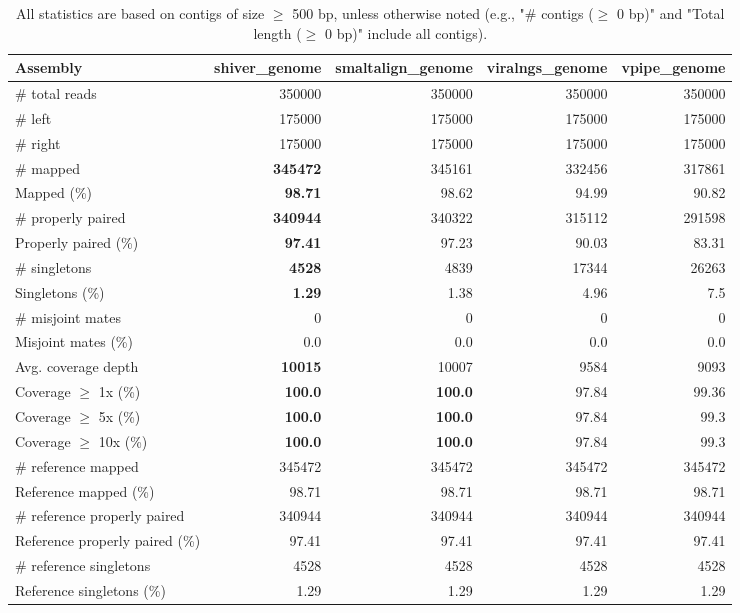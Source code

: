 \documentclass[12pt,a4paper]{article}
\begin{document}
\begin{table}[ht]
\begin{center}
\caption{All statistics are based on contigs of size $\geq$ 500 bp, unless otherwise noted (e.g., "\# contigs ($\geq$ 0 bp)" and "Total length ($\geq$ 0 bp)" include all contigs).}
\begin{tabular}{|l*{4}{|r}|}
\hline
Assembly & shiver\_genome & smaltalign\_genome & viralngs\_genome & vpipe\_genome \\ \hline
\# total reads & 350000 & 350000 & 350000 & 350000 \\ \hline
\# left & 175000 & 175000 & 175000 & 175000 \\ \hline
\# right & 175000 & 175000 & 175000 & 175000 \\ \hline
\# mapped & {\bf 345472} & 345161 & 332456 & 317861 \\ \hline
Mapped (\%) & {\bf 98.71} & 98.62 & 94.99 & 90.82 \\ \hline
\# properly paired & {\bf 340944} & 340322 & 315112 & 291598 \\ \hline
Properly paired (\%) & {\bf 97.41} & 97.23 & 90.03 & 83.31 \\ \hline
\# singletons & {\bf 4528} & 4839 & 17344 & 26263 \\ \hline
Singletons (\%) & {\bf 1.29} & 1.38 & 4.96 & 7.5 \\ \hline
\# misjoint mates & 0 & 0 & 0 & 0 \\ \hline
Misjoint mates (\%) & 0.0 & 0.0 & 0.0 & 0.0 \\ \hline
Avg. coverage depth & {\bf 10015} & 10007 & 9584 & 9093 \\ \hline
Coverage $\geq$ 1x (\%) & {\bf 100.0} & {\bf 100.0} & 97.84 & 99.36 \\ \hline
Coverage $\geq$ 5x (\%) & {\bf 100.0} & {\bf 100.0} & 97.84 & 99.3 \\ \hline
Coverage $\geq$ 10x (\%) & {\bf 100.0} & {\bf 100.0} & 97.84 & 99.3 \\ \hline
\# reference mapped & 345472 & 345472 & 345472 & 345472 \\ \hline
Reference mapped (\%) & 98.71 & 98.71 & 98.71 & 98.71 \\ \hline
\# reference properly paired & 340944 & 340944 & 340944 & 340944 \\ \hline
Reference properly paired (\%) & 97.41 & 97.41 & 97.41 & 97.41 \\ \hline
\# reference singletons & 4528 & 4528 & 4528 & 4528 \\ \hline
Reference singletons (\%) & 1.29 & 1.29 & 1.29 & 1.29 \\ \hline

\end{tabular}
\end{center}
\end{table}
\end{document}
